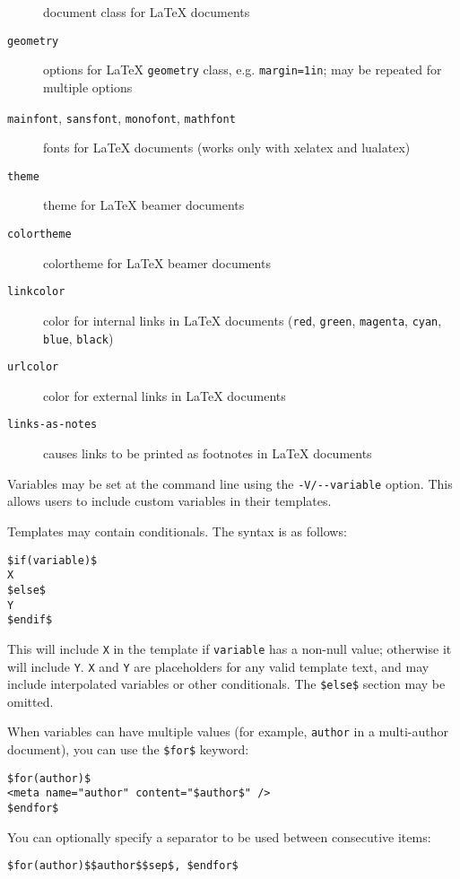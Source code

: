 \documentclass[]{article}
\begin{document}
\begin{description}
document class for LaTeX documents
\item[\texttt{geometry}]
options for LaTeX \texttt{geometry} class, e.g. \texttt{margin=1in}; may
be repeated for multiple options
\item[\texttt{mainfont}, \texttt{sansfont}, \texttt{monofont},
\texttt{mathfont}]
fonts for LaTeX documents (works only with xelatex and lualatex)
\item[\texttt{theme}]
theme for LaTeX beamer documents
\item[\texttt{colortheme}]
colortheme for LaTeX beamer documents
\item[\texttt{linkcolor}]
color for internal links in LaTeX documents (\texttt{red},
\texttt{green}, \texttt{magenta}, \texttt{cyan}, \texttt{blue},
\texttt{black})
\item[\texttt{urlcolor}]
color for external links in LaTeX documents
\item[\texttt{links-as-notes}]
causes links to be printed as footnotes in LaTeX documents
\end{description}

Variables may be set at the command line using the
\texttt{-V/-{}-variable} option. This allows users to include custom
variables in their templates.

Templates may contain conditionals. The syntax is as follows:

\begin{verbatim}
$if(variable)$
X
$else$
Y
$endif$
\end{verbatim}

This will include \texttt{X} in the template if \texttt{variable} has a
non-null value; otherwise it will include \texttt{Y}. \texttt{X} and
\texttt{Y} are placeholders for any valid template text, and may include
interpolated variables or other conditionals. The \texttt{\$else\$}
section may be omitted.

When variables can have multiple values (for example, \texttt{author} in
a multi-author document), you can use the \texttt{\$for\$} keyword:

\begin{verbatim}
$for(author)$
<meta name="author" content="$author$" />
$endfor$
\end{verbatim}

You can optionally specify a separator to be used between consecutive
items:

\begin{verbatim}
$for(author)$$author$$sep$, $endfor$
\end{verbatim}
\end{document}
